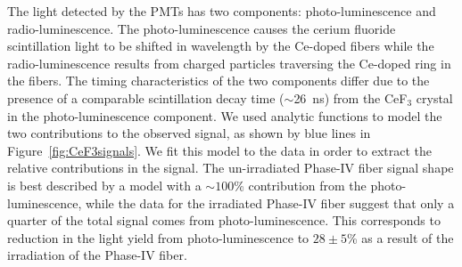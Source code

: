 \documentclass[a4paper,11pt]{article}
\begin{document}
The light detected by the PMTs has two components: photo-luminescence and radio-luminescen\-ce. The photo-luminescence causes the cerium fluoride scintillation light to be shifted in wavelength by the Ce-doped fibers while the radio-lumines\-cen\-ce results from charged particles traversing the Ce-doped ring in the fibers. The timing characteristics of the two components differ due to the presence of a comparable scintillation decay time ($\sim$26~ns) from the CeF$_3$ crystal in the photo-luminescence component. We used analytic functions to model the two contributions to the observed signal, as shown by blue lines in Figure~\ref{fig:CeF3signals}. We fit this model to the data in order to extract the relative contributions in the signal. The un-irradiated Phase-IV fiber signal shape is best described by a model with a $\sim100$\% contribution from the photo-luminescence, while the data for the irradiated Phase-IV fiber suggest that only a quarter of the total signal comes from photo-luminescence. This corresponds to reduction in the light yield from photo-luminescence to $28 \pm 5$\% as a result of the irradiation of the Phase-IV fiber. 
\end{document}
